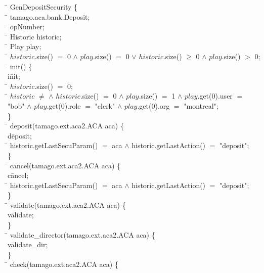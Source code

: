 \begin{program}
\=   GenDepositSecurity \{\\
\>  \=    tamago.aca.bank.Deposit;\\
\>  \=       opNumber;\\
\>  \=     Historic historic;\\
\>  \=     Play play;\\
\>  \=   $historic$.size() $=$ 0 $\land$ $play$.size() $=$ 0 $\lor$ $historic$.size() $\geq$ 0 $\land$ $play$.size() $>$ 0;\\
\>  \=     init() \{\\
\>  \>   i\= nit;\\
\>  \>   \= $historic$.size() $=$ 0;\\
\>  \>  \=   $historic$ $\neq$   $\land$ $historic$.size() $=$ 0 $\land$ $play$.size() $=$ 1 $\land$ $play$.get(0).user $=$ "bob" $\land$ $play$.get(0).role $=$ "clerk" $\land$ $play$.get(0).org $=$ "montreal";\\
\>  \}\\
\>  \=     deposit(tamago.ext.aca2.ACA aca) \{\\
\>  \>   d\= eposit;\\
\>  \>  \=   historic.getLastSecuParam() $=$ aca $\land$ historic.getLastAction() $=$ "deposit";\\
\>  \}\\
\>  \=     cancel(tamago.ext.aca2.ACA aca) \{\\
\>  \>   c\= ancel;\\
\>  \>  \=   historic.getLastSecuParam() $=$ aca $\land$ historic.getLastAction() $=$ "deposit";\\
\>  \}\\
\>  \=     validate(tamago.ext.aca2.ACA aca) \{\\
\>  \>   v\= alidate;\\
\>  \}\\
\>  \=     validate_director(tamago.ext.aca2.ACA aca) \{\\
\>  \>   v\= alidate_dir;\\
\>  \}\\
\>  \=     check(tamago.ext.aca2.ACA aca) \{\\

\end{program}

